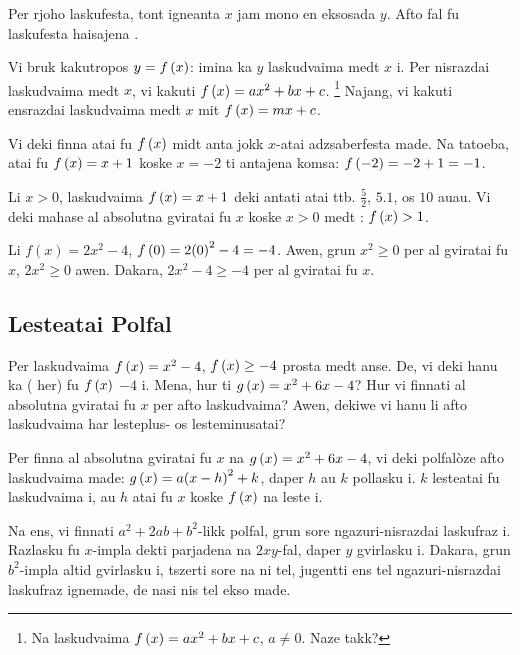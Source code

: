 Per rjoho laskufesta, tont igneanta \(x\) jam mono en eksosada \(y\).
Afto fal fu laskufesta haisajena .

Vi bruk kakutropos \(y = f\left(x\right)\): imina ka \(y\) laskudvaima medt \(x\) i.
Per nisrazdai laskudvaima medt \(x\), vi kakuti
\(f \left(x\right) = ax^2 + bx + c\). \footnote{Na  laskudvaima
	\(f \left(x\right) = ax^2 + bx + c\), \(a \neq 0\). Naze takk?}
Najang, vi kakuti ensrazdai laskudvaima medt \(x\) mit \(f \left(x\right) = mx + c\).

Vi deki finna atai fu \(f \left(x\right)\) midt anta jokk \(x\)-atai adzsaberfesta made.
Na tatoeba, atai fu \(f \left(x\right) = x + 1\) koske \(x = -2\) ti antajena komsa: \(f \left(-2\right) = -2 + 1 = -1\).

Li \(x > 0\), laskudvaima \(f \left(x\right) = x + 1\) deki antati atai ttb. \(\frac{5}{2}\), \(5.1\), os \(10\) auau.
Vi deki mahase al absolutna gviratai fu \(x\) koske \(x > 0\) medt : \(f \left(x\right) > 1\).

\begin{example}
	Li \(f\left(x\right) = 2x^2 - 4\), \(f\left(0\right) = 2{\left(0\right)}^2 - 4 = -4\). Awen, grun
	\(x^2 \geq 0\) per al gviratai fu \(x\), \(2x^2 \geq 0\) awen. Dakara,
	\(2x^2 - 4 \geq -4\) per al gviratai fu \(x\).
\end{example}

\subsection{Lesteatai Polfal}

Per laskudvaima \(f \left(x\right) = x^2 - 4\), \(f\left(x\right) \geq - 4\) prosta medt anse. De, vi deki hanu
ka  ( her) fu \(f\left(x\right)\) \(-4\) i. Mena, hur ti
\(g \left(x\right) = x^2+6x-4\)? Hur vi finnati al absolutna gviratai fu \(x\) per afto laskudvaima?
Awen, dekiwe vi hanu li afto laskudvaima har lesteplus- os lesteminusatai?

Per finna al absolutna gviratai fu \(x\) na \(g\left(x\right) = x^2 + 6x - 4\), vi deki polfalòze afto
laskudvaima  made: \(g\left(x\right) = a{\left(x - h\right)}^2 + k\), daper
\(h\) au \(k\) pollasku i. \(k\) lesteatai fu laskudvaima i, au \(h\) atai fu \(x\) koske \(f \left(x\right)\)
na leste i.

Na ens, vi finnati \(a^2 + 2ab + b^2\)-likk polfal, grun sore ngazuri-nisrazdai laskufraz i.
Razlasku fu \(x\)-impla dekti parjadena na \(2xy\)-fal, daper \(y\) gvirlasku i.
Dakara, grun \(b^2\)-impla altid gvirlasku i, tszerti sore na ni tel, jugentti ens tel ngazuri-nisrazdai
laskufraz ignemade, de nasi nis tel ekso made.

